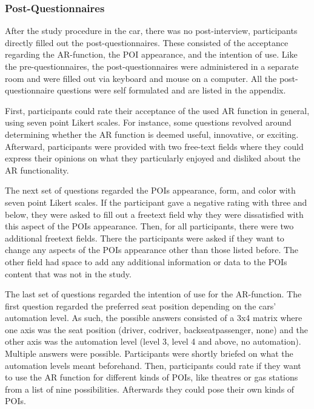 \subsubsection*{\textbf{Post-Questionnaires}}
After the study procedure in the car, there was no post-interview, participants directly filled out the post-questionnaires. These consisted of the acceptance regarding the AR-function, the POI appearance, and the intention of use. Like the pre-questionnaires, the post-questionnaires were administered in a separate room and were filled out via keyboard and mouse on a computer. All the post-questionnaire questions were self formulated and are listed in the appendix.

First, participants could rate their acceptance of the used AR function in general, using seven point Likert scales. For instance, some questions revolved around determining whether the AR function is deemed useful, innovative, or exciting. Afterward, participants were provided with two free-text fields where they could express their opinions on what they particularly enjoyed and disliked about the AR functionality.

The next set of questions regarded the POIs appearance, form, and color with seven point Likert scales. If the participant gave a negative rating with three and below, they were asked to fill out a freetext field why they were dissatisfied with this aspect of the POIs appearance. Then, for all participants, there were two additional freetext fields. There the participants were asked if they want to change any aspects of the POIs appearance other than those listed before. The other field had space to add any additional information or data to the POIs content that was not in the study.

The last set of questions regarded the intention of use for the AR-function. The first question regarded the preferred seat position depending on the cars' automation level. As such, the possible answers consisted of a 3x4 matrix where one axis was the seat position (driver, codriver, backseatpassenger, none) and the other axis was the automation level (level 3, level 4 and above, no automation). Multiple answers were possible. Participants were shortly briefed on what the automation levels meant beforehand.
Then, participants could rate if they want to use the AR function for different kinds of POIs, like theatres or gas stations from a list of nine possibilities. Afterwards they could pose their own kinds of POIs. 